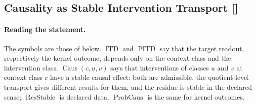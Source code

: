 \subsection{Causality as Stable Intervention Transport [\texorpdfstring{}{F25}]}\label{sec:status-records-coherence:causality}

\paragraph{Reading the statement.} The symbols are those of  below.
\(\operatorname{ITD}\) and \(\operatorname{PITD}\) say that the target
readout, respectively the kernel outcome, depends only on the context
class and the intervention class. \(\operatorname{Caus}(c,u,v)\) says
that interventions of classes \(u\) and \(v\) at context class \(c\)
have a stable causal effect: both are admissible, the quotient-level
transport gives different results for them, and the residue is stable
in the declared sense; \(\operatorname{ResStable}\) is declared data.
\(\operatorname{ProbCaus}\) is the same for kernel outcomes.

